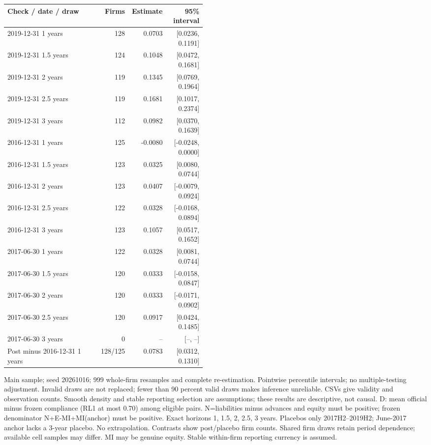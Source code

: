 \begin{threeparttable}
\begin{tabular}{p{0.47\linewidth}rrr}
\toprule
Check / date / draw & Firms & Estimate & 95\% interval \\
\midrule
2019-12-31 1 years & 128 & 0.0703 & [0.0236, 0.1191] \\
2019-12-31 1.5 years & 124 & 0.1048 & [0.0472, 0.1681] \\
2019-12-31 2 years & 119 & 0.1345 & [0.0769, 0.1964] \\
2019-12-31 2.5 years & 119 & 0.1681 & [0.1017, 0.2374] \\
2019-12-31 3 years & 112 & 0.0982 & [0.0370, 0.1639] \\
2016-12-31 1 years & 125 & -0.0080 & [-0.0248, 0.0000] \\
2016-12-31 1.5 years & 123 & 0.0325 & [0.0080, 0.0744] \\
2016-12-31 2 years & 123 & 0.0407 & [-0.0079, 0.0924] \\
2016-12-31 2.5 years & 122 & 0.0328 & [-0.0168, 0.0894] \\
2016-12-31 3 years & 123 & 0.1057 & [0.0517, 0.1652] \\
2017-06-30 1 years & 122 & 0.0328 & [0.0081, 0.0744] \\
2017-06-30 1.5 years & 120 & 0.0333 & [-0.0158, 0.0847] \\
2017-06-30 2 years & 120 & 0.0333 & [-0.0171, 0.0902] \\
2017-06-30 2.5 years & 120 & 0.0917 & [0.0424, 0.1485] \\
2017-06-30 3 years & 0 & -- & [--, --] \\
Post minus 2016-12-31 1 years & 128/125 & 0.0783 & [0.0312, 0.1310] \\
\bottomrule
\end{tabular}
\begin{tablenotes}[flushleft]\footnotesize
\item[] Main sample; seed 20261016; 999 whole-firm resamples and complete re-estimation. Pointwise percentile intervals; no multiple-testing adjustment. Invalid draws are not replaced; fewer than 90 percent valid draws makes inference unreliable. CSVs give validity and observation counts. Smooth density and stable reporting selection are assumptions; these results are descriptive, not causal. D: mean official minus frozen compliance (RL1 at most 0.70) among eligible pairs. N=liabilities minus advances and equity must be positive; frozen denominator N+E-MI+MI(anchor) must be positive. Exact horizons 1, 1.5, 2, 2.5, 3 years. Placebos only 2017H2--2019H2; June-2017 anchor lacks a 3-year placebo. No extrapolation. Contrasts show post/placebo firm counts. Shared firm draws retain period dependence; available cell samples may differ. MI may be genuine equity. Stable within-firm reporting currency is assumed.
\end{tablenotes}
\end{threeparttable}
